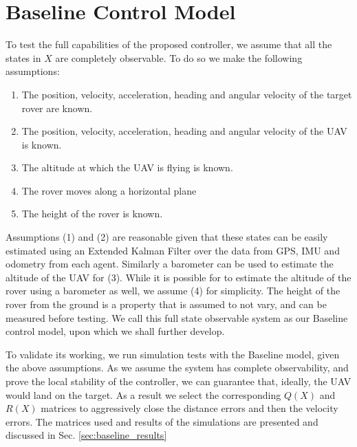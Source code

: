 \documentclass[conf]{new-aiaa}
\begin{document}
\section{Baseline Control Model}
To test the full capabilities of the proposed controller, we assume that all the states in $X$ are completely observable. To do so we make the following assumptions:
\begin{enumerate}
\item The position, velocity, acceleration, heading and angular velocity of the target rover are known.
\item The position, velocity, acceleration, heading and angular velocity of the UAV is known.
\item The altitude at which the UAV is flying is known.
\item The rover moves along a horizontal plane
\item The height of the rover is known.
\end{enumerate}
Assumptions (1) and (2) are reasonable given that these states can be easily estimated using an Extended Kalman Filter over the data from GPS, IMU and odometry from each agent. Similarly a barometer can be used to estimate the altitude of the UAV for (3). While it is possible for to estimate the altitude of the rover using a barometer as well, we assume (4) for simplicity. The height of the rover from the ground is a property that is assumed to not vary, and can be measured before testing. We call this full state observable system as our Baseline control model, upon which we shall further develop.

To validate its working, we run simulation tests with the Baseline model, given the above assumptions. As we assume the system has complete observability, and prove the local stability of the controller, we can guarantee that, ideally, the UAV would land on the target. As a result we select the corresponding $Q(X)$ and $R(X)$ matrices to aggressively close the distance errors and then the velocity errors. The matrices used and results of the simulations are presented and discussed in Sec. \ref{sec:baseline_results}
\end{document}

